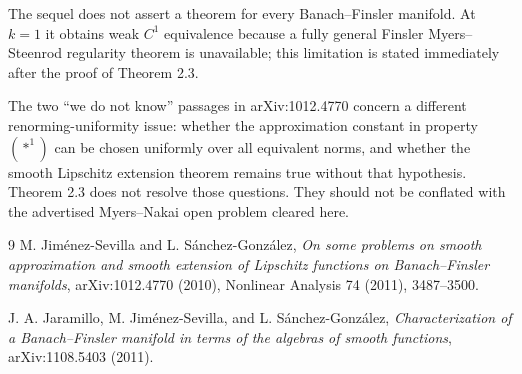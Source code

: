 \documentclass[10pt]{article}
\begin{document}
The sequel does not assert a theorem for every Banach--Finsler manifold. At
$k=1$ it obtains weak $C^1$ equivalence because a fully general Finsler
Myers--Steenrod regularity theorem is unavailable; this limitation is stated
immediately after the proof of Theorem 2.3.

The two ``we do not know'' passages in arXiv:1012.4770 concern a different
renorming-uniformity issue: whether the approximation constant in property
$(*^1)$ can be chosen uniformly over all equivalent norms, and whether the
smooth Lipschitz extension theorem remains true without that hypothesis.
Theorem 2.3 does not resolve those questions. They should not be conflated
with the advertised Myers--Nakai open problem cleared here.

\small
\begin{thebibliography}{9}
M. Jim\'enez-Sevilla and L. S\'anchez-Gonz\'alez,
\emph{On some problems on smooth approximation and smooth extension of
Lipschitz functions on Banach--Finsler manifolds}, arXiv:1012.4770 (2010),
Nonlinear Analysis 74 (2011), 3487--3500.

J. A. Jaramillo, M. Jim\'enez-Sevilla, and L. S\'anchez-Gonz\'alez,
\emph{Characterization of a Banach--Finsler manifold in terms of the algebras
of smooth functions}, arXiv:1108.5403 (2011).
\end{thebibliography}
\end{document}
